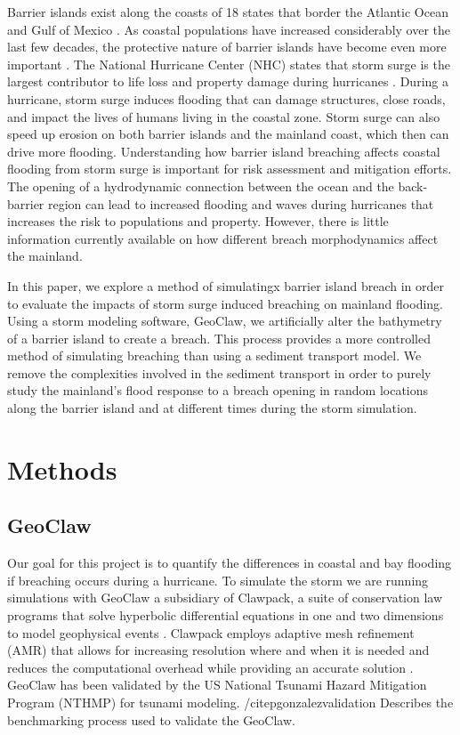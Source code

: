 \documentclass{coastal_paper}
\begin{document}
Barrier islands exist along the coasts of 18 states that border the Atlantic Ocean and Gulf of Mexico \citep{Zhang2011}. As coastal populations have increased considerably over the last few decades, the protective nature of barrier islands have become even more important \citep{Zhang2011}. The National Hurricane Center (NHC) states that storm surge  is the largest contributor to life loss and property damage during hurricanes \citep{Center2006}. During a hurricane, storm surge induces flooding that can damage structures, close roads, and impact the lives of humans living in the coastal zone. Storm surge can also speed up erosion on both barrier islands and the mainland coast, which then can drive more flooding. Understanding how barrier island breaching affects coastal flooding from storm surge is important for risk assessment and mitigation efforts. The opening of a hydrodynamic connection between the ocean and the back-barrier region can lead to increased flooding and waves during hurricanes that increases the risk to populations and property. However, there is little information currently available on how different breach morphodynamics affect the mainland.

In this paper, we explore a method of simulatingx barrier island breach in order to evaluate the impacts of storm surge induced breaching on mainland flooding. Using a storm modeling software, GeoClaw, we artificially alter the bathymetry of a barrier island to create a breach. This process provides a more controlled method of simulating breaching than using a sediment transport model. We remove the complexities involved in the sediment transport in order to purely study the mainland's flood response to a breach opening in random locations along the barrier island and at different times during the storm simulation. 

\section{Methods}
\subsection*{GeoClaw}
Our goal for this project is to quantify the differences in coastal and bay flooding if breaching occurs during a hurricane. To simulate the storm we are running simulations with GeoClaw a subsidiary of Clawpack, a suite of conservation law programs that solve hyperbolic differential equations in one and two dimensions to model geophysical events \citep{clawpack, mandli2016clawpack}. Clawpack employs adaptive mesh refinement (AMR) that allows for increasing resolution where and when it is needed and reduces the computational overhead while providing an accurate solution \citep{Berger2011TheRefinement}. GeoClaw has been validated by the US National Tsunami Hazard Mitigation Program (NTHMP) for tsunami modeling. /citep{gonzalezvalidation} Describes the benchmarking process used to validate the GeoClaw. 
\end{document}
